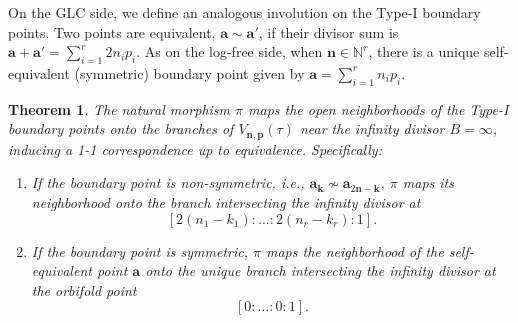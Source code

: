 \documentclass[11pt]{amsart}
\newtheorem{theorem}{Theorem}[section]
\theoremstyle{remark}
\numberwithin{equation}{section}
\begin{document}
On the GLC side, we define an analogous involution on the Type-I boundary points. Two points are equivalent, $\mathbf{a} \sim \mathbf{a}'$, if their divisor sum is $\mathbf{a} + \mathbf{a}' = \sum_{i=1}^r 2n_i p_i$. As on the log-free side, when $\mathbf{n} \in \mathbb{N}^r$, there is a unique self-equivalent (symmetric) boundary point given by $\mathbf{a} = \sum_{i=1}^r n_i p_i$.

\begin{theorem}\label{branch}
The natural morphism $\pi$ maps the open neighborhoods of the Type-I boundary points onto the branches of $V_{\mathbf{n},\mathbf{p}}(\tau)$ near the infinity divisor $B=\infty$, inducing a 1-1 correspondence up to equivalence. Specifically:
\begin{enumerate}
    \item If the boundary point is non-symmetric, i.e., $\mathbf{a}_{\mathbf{k}} \nsim \mathbf{a}_{2\mathbf{n}-\mathbf{k}}$, $\pi$ maps its neighborhood onto the branch intersecting the infinity divisor at 
    \[
        [2(n_1 - k_1) : \dots : 2(n_r - k_r) : 1].
    \]
    \item If the boundary point is symmetric, $\pi$ maps the neighborhood of the self-equivalent point $\mathbf{a}$ onto the unique branch intersecting the infinity divisor at the orbifold point
    \[
        [0 : \dots : 0 : 1].
    \]
\end{enumerate}
\end{theorem}
\end{document}
